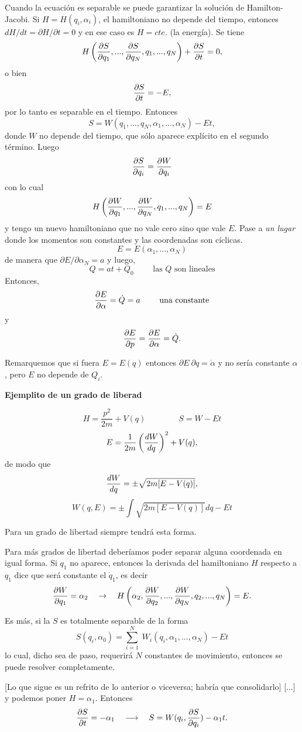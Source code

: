 \documentclass[10pt,oneside]{CBFT_book}
\begin{document}
Cuando la ecuación es separable se puede garantizar la solución de Hamilton-Jacobi.
Si $H=H(q_i,\alpha_i)$, el hamiltoniano no depende del tiempo, entonces $dH/dt = \partial H/\partial t=0$ y en ese caso es 
$H=cte.$ (la energía). Se tiene
\[
	H \left( \frac{\partial^{\hspace{-0.05em}} {S}}{\partial {q_1}^{\hspace{-0.05em}}},...,\frac{\partial^{\hspace{-0.05em}} {S}}{\partial {q_N}^{\hspace{-0.05em}}},q_1,...,q_N \right) + \frac{\partial^{\hspace{-0.05em}} {S}}{\partial {t}^{\hspace{-0.05em}}} = 0, 
\]
o bien
\[
	\frac{\partial^{\hspace{-0.05em}} {S}}{\partial {t}^{\hspace{-0.05em}}} = -E,
\]
por lo tanto es separable en el tiempo. Entonces
\[
	S = W(q_1,...,q_N,\alpha_1,...,\alpha_N) - E t,
\]
donde $W$ no depende del tiempo, que sólo aparece explícito en el segundo término. Luego
\[
	\frac{\partial^{\hspace{-0.05em}} {S}}{\partial {q_i}^{\hspace{-0.05em}}} = \frac{\partial^{\hspace{-0.05em}} {W}}{\partial {q_i}^{\hspace{-0.05em}}}
\]
con lo cual 
\[
	H \left( \frac{\partial^{\hspace{-0.05em}} {W}}{\partial {q_1}^{\hspace{-0.05em}}},...,\frac{\partial^{\hspace{-0.05em}} {W}}{\partial {q_N}^{\hspace{-0.05em}}},q_1,...,q_N \right) = E
\]
y tengo un nuevo hamiltoniano que no vale cero sino que vale $E$.
Pase a {\it un lugar} donde los momentos son constantes y las coordenadas son cíclicas.
\[
	E = E(\alpha_1, ..., \alpha_N )
\]
de manera que $\partial E/\partial \alpha_N = a$ y luego,
\[
	Q = at + Q_0 \qquad \text{ las $Q$ son lineales}
\]
Entonces,
\[
	\frac{\partial^{\hspace{-0.05em}} {E}}{\partial {\alpha}^{\hspace{-0.05em}}} = \dot{Q} = a \qquad \text{ una constante}
\]
y
\[
	\frac{\partial^{\hspace{-0.05em}} {E}}{\partial {p}^{\hspace{-0.05em}}} = \frac{\partial^{\hspace{-0.05em}} {E}}{\partial {\alpha}^{\hspace{-0.05em}}} = \dot{Q}.
\]

Remarquemos que si fuera $E=E(q)$ entonces $\partial E \ \partial q = \dot{\alpha}$ y no sería constante $\alpha$, pero $E$ no 
depende de $Q_i$.

\begin{ejemplo}{\bf Ejemplito de un grado de liberad}

\[
	H = \frac{p^2}{2m} + V(q) \qquad \qquad S = W - Et
\]
\[
	E = \frac{1}{2m} \left( \frac{d^{\hspace{-0.05em}} {W}}{d {q}^{\hspace{-0.05em}}} \right)^2 + V(q), 
\]
de modo que 
\[
	\frac{d^{\hspace{-0.05em}} {W}}{d {q}^{\hspace{-0.05em}}} = \pm \sqrt{2m[E-V(q)]},
\]
\[
	W(q,E) = \pm \int \sqrt{2m[E-V(q)]} dq - Et
\]

Para un grado de libertad siempre tendrá esta forma.
\end{ejemplo}

Para más grados de libertad deberíamos poder separar alguna coordenada en igual forma. Si $q_1$ no aparece, entonces la derivada 
del hamiltoniano $H$ respecto a $q_1$ dice que será constante el $\dot{q}_1$, es decir
\[
	\frac{\partial^{\hspace{-0.05em}} {W}}{\partial {q_1}^{\hspace{-0.05em}}} = \alpha_2 \quad \to \quad 
	H\left( \alpha_2, \frac{\partial^{\hspace{-0.05em}} {W}}{\partial {q_2}^{\hspace{-0.05em}}},...,\frac{\partial^{\hspace{-0.05em}} {W}}{\partial {q_N}^{\hspace{-0.05em}}},q_2,...,q_N \right) = E.
\]

Es más, si la $S$ es totalmente separable de la forma 
\[
	S(q_i,\alpha_0) = \sum_{i=1}^N \; W_i(q_i,\alpha_1,...,\alpha_N) - Et
\]
lo cual, dicho sea de paso, requerirá $N$ constantes de movimiento, entonces se puede resolver completamente.

[Lo que sigue es un refrito de lo anterior o viceversa; habría que consolidarlo]
[...] y podemos poner $H=\alpha_1$.
Entonces
\[
	\frac{\partial^{\hspace{-0.05em}} {S}}{\partial {t}^{\hspace{-0.05em}}} = -\alpha_1 \quad \longrightarrow \quad S=W(q_i,\frac{\partial^{\hspace{-0.05em}} {S}}{\partial {q_i}^{\hspace{-0.05em}}}) -\alpha_1 t .
\]
\end{document}

